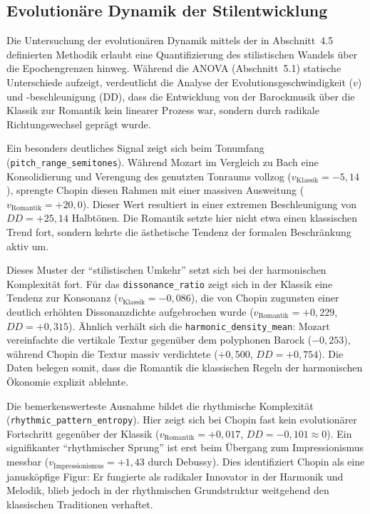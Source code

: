 \documentclass[12pt,a4paper]{article}
\theoremstyle{definition}
\begin{document}
\subsection{Evolutionäre Dynamik der Stilentwicklung}
Die Untersuchung der evolutionären Dynamik mittels der in Abschnitt~4.5 definierten Methodik erlaubt eine Quantifizierung des stilistischen Wandels über die Epochengrenzen hinweg. Während die ANOVA (Abschnitt~5.1) statische Unterschiede aufzeigt, verdeutlicht die Analyse der Evolutionsgeschwindigkeit ($v$) und -beschleunigung (DD), dass die Entwicklung von der Barockmusik über die Klassik zur Romantik kein linearer Prozess war, sondern durch radikale Richtungswechsel geprägt wurde.

Ein besonders deutliches Signal zeigt sich beim Tonumfang (\texttt{pitch\_range\_semitones}). Während Mozart im Vergleich zu Bach eine Konsolidierung und Verengung des genutzten Tonraums vollzog ($v_{\text{Klassik}} = -5{,}14$), sprengte Chopin diesen Rahmen mit einer massiven Ausweitung ($v_{\text{Romantik}} = +20{,}0$). Dieser Wert resultiert in einer extremen Beschleunigung von $DD = +25{,}14$ Halbtönen. Die Romantik setzte hier nicht etwa einen klassischen Trend fort, sondern kehrte die ästhetische Tendenz der formalen Beschränkung aktiv um.

Dieses Muster der \enquote{stilistischen Umkehr} setzt sich bei der harmonischen Komplexität fort. Für das \texttt{dissonance\_ratio} zeigt sich in der Klassik eine Tendenz zur Konsonanz ($v_{\text{Klassik}} = -0{,}086$), die von Chopin zugunsten einer deutlich erhöhten Dissonanzdichte aufgebrochen wurde ($v_{\text{Romantik}} = +0{,}229$, $DD = +0{,}315$). Ähnlich verhält sich die \texttt{harmonic\_density\_mean}: Mozart vereinfachte die vertikale Textur gegenüber dem polyphonen Barock ($-0{,}253$), während Chopin die Textur massiv verdichtete ($+0{,}500$, $DD = +0{,}754$). Die Daten belegen somit, dass die Romantik die klassischen Regeln der harmonischen Ökonomie explizit ablehnte.

Die bemerkenswerteste Ausnahme bildet die rhythmische Komplexität (\texttt{rhythmic\_pattern\_entropy}). Hier zeigt sich bei Chopin fast kein evolutionärer Fortschritt gegenüber der Klassik ($v_{\text{Romantik}} = +0{,}017$, $DD = -0{,}101 \approx 0$). Ein signifikanter \enquote{rhythmischer Sprung} ist erst beim Übergang zum Impressionismus messbar ($v_{\text{Impressionismus}} = +1{,}43$ durch Debussy). Dies identifiziert Chopin als eine janusköpfige Figur: Er fungierte als radikaler Innovator in der Harmonik und Melodik, blieb jedoch in der rhythmischen Grundstruktur weitgehend den klassischen Traditionen verhaftet.
\end{document}
